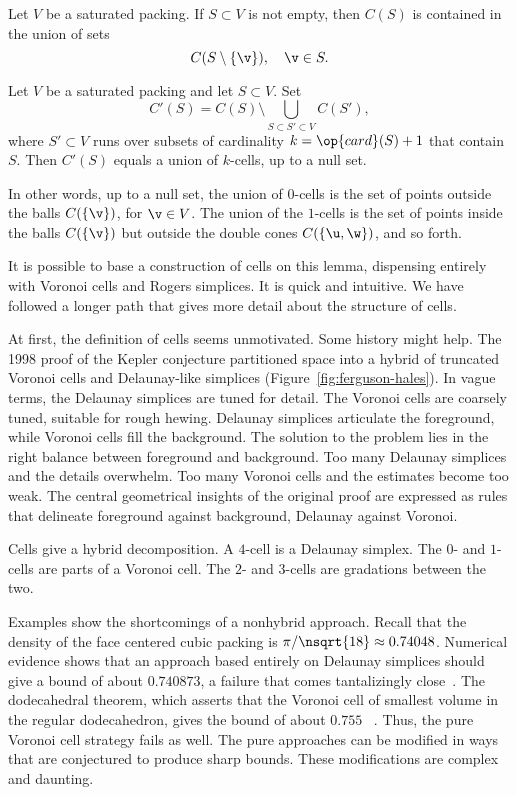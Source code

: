 \begin{lemma}
Let $V$ be a saturated packing.
If $S\subset V$ is not empty, then $C(S)$ is contained in the union of sets
\[
C(S\setminus \{\v\}),  \quad \v\in S.
\]
\end{lemma}

\begin{lemma}
Let $V$ be a saturated packing and let $S\subset V$. 
Set
\[C'(S) = C(S) \setminus \bigcup_{S\subset S'\subset V} C(S'),\] where
$S'\subset V$ runs over subsets of cardinality $k=\op{card}(S)+1$ that
contain $S$.  Then $C'(S)$ equals a union of $k$-cells,
up to a null set.
\end{lemma}

In other words, up to a null set, the union of $0$-cells is the set of points
outside the balls $C(\{\v\})$, for $\v\in V$.  The union of the $1$-cells
is the set of points inside the balls $C(\{\v\})$ but outside the double cones
$C(\{\u,\w\})$, and so forth.

It is possible to base a construction of cells on this lemma,
dispensing entirely with Voronoi cells and Rogers simplices.  It is
quick and intuitive.  We have followed a longer path that gives more
detail about the structure of cells.

\bigskip

At first, the definition of  cells seems unmotivated.  Some
history might help.  The 1998 proof of the Kepler conjecture
partitioned space into a hybrid of truncated Voronoi cells and Delaunay-like
simplices (Figure~\ref{fig:ferguson-hales}).  
In vague terms, the Delaunay simplices are tuned for
detail.  The Voronoi cells are coarsely tuned, suitable for rough
hewing.  Delaunay simplices articulate the foreground, while Voronoi
cells fill the background.  The solution to the problem lies in the
right balance between foreground and background.  Too many Delaunay
simplices and the details overwhelm.  Too many Voronoi cells and the
estimates become too weak.  The central geometrical insights of the
original proof are expressed as rules that delineate foreground
against background, Delaunay against Voronoi.

\figFIFJALK %

Cells give a hybrid decomposition.  A $4$-cell is a Delaunay simplex.
The $0$- and $1$-cells are parts of a Voronoi cell.  The $2$- and
$3$-cells are gradations between the two.

Examples show the shortcomings of a nonhybrid approach.  Recall that
the density of the face centered cubic packing is
$\pi/\nsqrt{18}\approx 0.74048$.  Numerical evidence shows that an
approach based entirely on Delaunay simplices should give a bound of
about $0.740873$, a failure that comes tantalizingly
close~\cite{Hales:1992:JCAM}.  The dodecahedral theorem, which asserts
that the Voronoi cell of smallest volume in the regular dodecahedron,
gives the bound of about $0.755$ ~\cite{Hales:2010:Dodec}.  Thus, the
pure Voronoi cell strategy fails as well.  The pure approaches can be
modified in ways that are conjectured to produce sharp bounds. These
modifications are complex and daunting.

